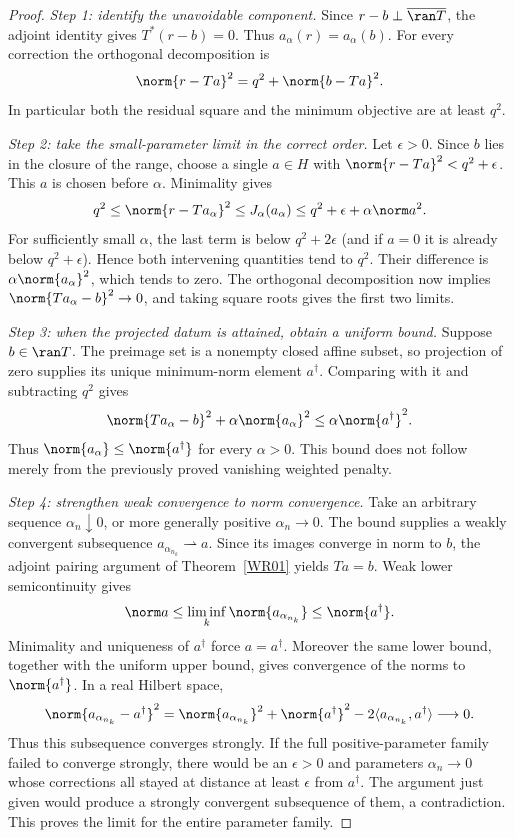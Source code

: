 \begin{proof}
\emph{Step 1: identify the unavoidable component.} Since $r-b\perp\overline{\ran T}$, the adjoint identity gives $T^*(r-b)=0$. Thus $a_\alpha(r)=a_\alpha(b)$. For every correction the orthogonal decomposition is
\[
 \norm{r-Ta}^2=q^2+\norm{b-Ta}^2.
\]
In particular both the residual square and the minimum objective are at least $q^2$.

\emph{Step 2: take the small-parameter limit in the correct order.} Let $\epsilon>0$. Since $b$ lies in the closure of the range, choose a single $a\in H$ with $\norm{r-Ta}^2<q^2+\epsilon$. This $a$ is chosen before $\alpha$. Minimality gives
\[
 q^2\le\norm{r-Ta_\alpha}^2
 \le J_\alpha(a_\alpha)
 \le q^2+\epsilon+\alpha\norm a^2.
\]
For sufficiently small $\alpha$, the last term is below $q^2+2\epsilon$ (and if $a=0$ it is already below $q^2+\epsilon$). Hence both intervening quantities tend to $q^2$. Their difference is $\alpha\norm{a_\alpha}^2$, which tends to zero. The orthogonal decomposition now implies $\norm{Ta_\alpha-b}^2\to0$, and taking square roots gives the first two limits.

\emph{Step 3: when the projected datum is attained, obtain a uniform bound.} Suppose $b\in\ran T$. The preimage set is a nonempty closed affine subset, so projection of zero supplies its unique minimum-norm element $a^\dagger$. Comparing with it and subtracting $q^2$ gives
\[
 \norm{Ta_\alpha-b}^2+\alpha\norm{a_\alpha}^2
 \le\alpha\norm{a^\dagger}^2.
\]
Thus $\norm{a_\alpha}\le\norm{a^\dagger}$ for every $\alpha>0$. This bound does not follow merely from the previously proved vanishing weighted penalty.

\emph{Step 4: strengthen weak convergence to norm convergence.} Take an arbitrary sequence $\alpha_n\downarrow0$, or more generally positive $\alpha_n\to0$. The bound supplies a weakly convergent subsequence $a_{\alpha_{n_k}}\rightharpoonup a$. Since its images converge in norm to $b$, the adjoint pairing argument of Theorem~\ref{WR01} yields $Ta=b$. Weak lower semicontinuity gives
\[
 \norm a\le\liminf_k\norm{a_{\alpha_{n_k}}}
 \le\norm{a^\dagger}.
\]
Minimality and uniqueness of $a^\dagger$ force $a=a^\dagger$. Moreover the same lower bound, together with the uniform upper bound, gives convergence of the norms to $\norm{a^\dagger}$. In a real Hilbert space,
\[
 \norm{a_{\alpha_{n_k}}-a^\dagger}^2
 =\norm{a_{\alpha_{n_k}}}^2+\norm{a^\dagger}^2
       -2\langle a_{\alpha_{n_k}},a^\dagger\rangle\longrightarrow0.
\]
Thus this subsequence converges strongly. If the full positive-parameter family failed to converge strongly, there would be an $\epsilon>0$ and parameters $\alpha_n\to0$ whose corrections all stayed at distance at least $\epsilon$ from $a^\dagger$. The argument just given would produce a strongly convergent subsequence of them, a contradiction. This proves the limit for the entire parameter family.


\end{proof}

